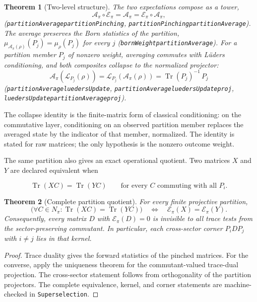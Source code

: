\documentclass[11pt]{article}
\renewcommand{\_}{\textunderscore\allowbreak}
\newtheorem{theorem}{Theorem}
\theoremstyle{remark}
\newcommand{\Tr}{\operatorname{Tr}}
\newcommand{\pinch}{\mathcal E}
\newcommand{\avg}{\mathcal A}
\newcommand{\lued}{\mathcal L}
\begin{document}
\begin{theorem}[Two-level structure]
\label{thm:two-level}
The two expectations compose as a tower,
\[
 \avg_\pi\circ\pinch_\pi=\avg_\pi=\pinch_\pi\circ\avg_\pi ,
\]
(\texttt{partitionAverage\_partitionPinching},
\texttt{partitionPinching\_partitionAverage}). The average preserves the
Born statistics of the partition,
$\mu_{\avg_\pi(\rho)}(P_j)=\mu_\rho(P_j)$ for every $j$
(\texttt{bornWeight\_partitionAverage}). For a partition member $P_j$ of
nonzero weight, averaging commutes with L\"uders conditioning, and both
composites collapse to the normalized projector:
\[
 \avg_\pi(\lued_{P_j}(\rho))
 =\lued_{P_j}(\avg_\pi(\rho))
 =\Tr(P_j)^{-1}\,P_j
\]
(\texttt{partitionAverage\_luedersUpdate},
\texttt{partitionAverage\_luedersUpdate\_proj},
\texttt{luedersUpdate\_partitionAverage\_proj}).
\end{theorem}

The collapse identity is the finite-matrix form of classical conditioning:
on the commutative layer, conditioning on an observed partition member
replaces the averaged state by the indicator of that member, normalized. The
identity is stated for raw matrices; the only hypothesis is the nonzero
outcome weight.

The same partition also gives an exact operational quotient. Two matrices
$X$ and $Y$ are declared equivalent when

\[
 \Tr(XC)=\Tr(YC)
 \qquad\text{for every }C\text{ commuting with all }P_i.
\]

\begin{theorem}[Complete partition quotient]
\label{thm:partition-operational-quotient}
For every finite projective partition,
\[
 \bigl(\forall C\in N_\pi:\Tr(XC)=\Tr(YC)\bigr)
 \quad\Longleftrightarrow\quad
 \pinch_\pi(X)=\pinch_\pi(Y).
\]
Consequently, every matrix $D$ with $\pinch_\pi(D)=0$ is invisible to all
trace tests from the sector-preserving commutant. In particular, each cross-sector corner
$P_iDP_j$ with $i\ne j$ lies in that kernel.
\end{theorem}

\begin{proof}
Trace duality gives the forward statistics of the pinched matrices. For the
converse, apply the uniqueness theorem for the commutant-valued trace-dual
projection. The cross-sector statement follows from orthogonality of the
partition projectors. The complete equivalence, kernel, and corner statements
are machine-checked in \texttt{Superselection}.
\end{proof}
\end{document}
